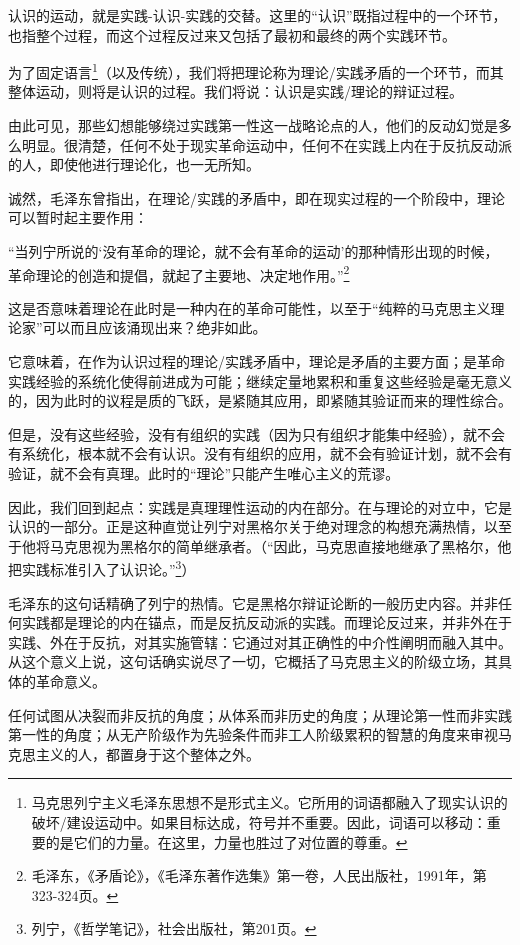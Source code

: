 \documentclass[fontset=fandol, a4paper, 12pt, twoside]{ctexart}
\renewenvironment{quote}
  {\list{}{\rightmargin=0cm \leftmargin=2em}%
   \item\relax\small\kaishu\color{black}}
  {\endlist}
\begin{document}
认识的运动，就是实践-认识-实践的交替。这里的“认识”既指过程中的一个环节，也指整个过程，而这个过程反过来又包括了最初和最终的两个实践环节。

为了固定语言\footnote{马克思列宁主义毛泽东思想不是形式主义。它所用的词语都融入了现实认识的破坏/建设运动中。如果目标达成，符号并不重要。因此，词语可以移动：重要的是它们的力量。在这里，力量也胜过了对位置的尊重。}（以及传统），我们将把理论称为理论/实践矛盾的一个环节，而其整体运动，则将是认识的过程。我们将说：认识是实践/理论的辩证过程。

由此可见，那些幻想能够绕过实践第一性这一战略论点的人，他们的反动幻觉是多么明显。很清楚，任何不处于现实革命运动中，任何不在实践上内在于反抗反动派的人，即使他进行理论化，也一无所知。

诚然，毛泽东曾指出，在理论/实践的矛盾中，即在现实过程的一个阶段中，理论可以暂时起主要作用：

\begin{quote}
“当列宁所说的‘没有革命的理论，就不会有革命的运动’的那种情形出现的时候，革命理论的创造和提倡，就起了主要地、决定地作用。”\footnote{毛泽东，《矛盾论》，《毛泽东著作选集》第一卷，人民出版社，1991年，第323-324页。}
\end{quote}

这是否意味着理论在此时是一种内在的革命可能性，以至于“纯粹的马克思主义理论家”可以而且应该涌现出来？绝非如此。

它意味着，在作为认识过程的理论/实践矛盾中，理论是矛盾的主要方面；是革命实践经验的系统化使得前进成为可能；继续定量地累积和重复这些经验是毫无意义的，因为此时的议程是质的飞跃，是紧随其应用，即紧随其验证而来的理性综合。

但是，没有这些经验，没有有组织的实践（因为只有组织才能集中经验），就不会有系统化，根本就不会有认识。没有有组织的应用，就不会有验证计划，就不会有验证，就不会有真理。此时的“理论”只能产生唯心主义的荒谬。

因此，我们回到起点：实践是真理理性运动的内在部分。在与理论的对立中，它是认识的一部分。正是这种直觉让列宁对黑格尔关于绝对理念的构想充满热情，以至于他将马克思视为黑格尔的简单继承者。（“因此，马克思直接地继承了黑格尔，他把实践标准引入了认识论。”\footnote{列宁，《哲学笔记》，社会出版社，第201页。}）

毛泽东的这句话精确了列宁的热情。它是黑格尔辩证论断的一般历史内容。并非任何实践都是理论的内在锚点，而是反抗反动派的实践。而理论反过来，并非外在于实践、外在于反抗，对其实施管辖：它通过对其正确性的中介性阐明而融入其中。从这个意义上说，这句话确实说尽了一切，它概括了马克思主义的阶级立场，其具体的革命意义。

任何试图从决裂而非反抗的角度；从体系而非历史的角度；从理论第一性而非实践第一性的角度；从无产阶级作为先验条件而非工人阶级累积的智慧的角度来审视马克思主义的人，都置身于这个整体之外。
\end{document}
